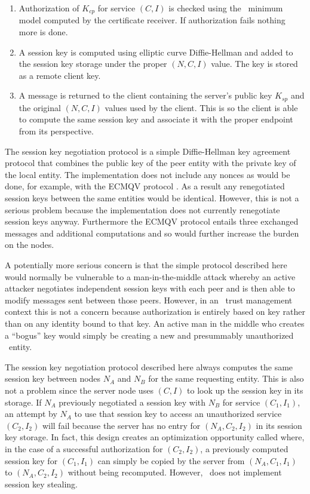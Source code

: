 \begin{enumerate}
\item Authorization of $K_{cp}$ for service $(C, I)$ is checked using the \RT\ minimum model
  computed by the certificate receiver. If authorization fails nothing more is done.
\item A session key is computed using elliptic curve Diffie-Hellman and added to the session key
  storage under the proper $(N, C, I)$ value. The key is stored as a remote client key.
\item A message is returned to the client containing the server's public key $K_{sp}$ and the
  original $(N, C, I)$ values used by the client. This is so the client is able to compute the
  same session key and associate it with the proper endpoint from its perspective.
\end{enumerate}

The session key negotiation protocol is a simple Diffie-Hellman key agreement protocol that
combines the public key of the peer entity with the private key of the local entity. The
implementation does not include any nonces as would be done, for example, with the ECMQV
protocol \cite{ISO-IEC-1170-3:2008}. As a result any renegotiated session keys between the same
entities would be identical. However, this is not a serious problem because the implementation
does not currently renegotiate session keys anyway. Furthermore the ECMQV protocol entails three
exchanged messages and additional computations and so would further increase the burden on the
nodes.

A potentially more serious concern is that the simple protocol described here would normally be
vulnerable to a man-in-the-middle attack whereby an active attacker negotiates independent
session keys with each peer and is then able to modify messages sent between those peers.
However, in an \RT\ trust management context this is not a concern because authorization is
entirely based on key rather than on any identity bound to that key. An active man in the middle
who creates a ``bogus'' key would simply be creating a new and presummably unauthorized \RT\
entity.

The session key negotiation protocol described here always computes the same session key between
nodes $N_A$ and $N_B$ for the same requesting entity. This is also not a problem since the
server node uses $(C, I)$ to look up the session key in its storage. If $N_A$ previously
negotiated a session key with $N_B$ for service $(C_1, I_1)$, an attempt by $N_A$ to use that
session key to access an unauthorized service $(C_2, I_2)$ will fail because the server has no
entry for $(N_A, C_2, I_2)$ in its session key storage. In fact, this design creates an
optimization opportunity called \newterm{session key stealing} where, in the case of a
successful authorization for $(C_2, I_2)$, a previously computed session key for $(C_1, I_1)$
can simply be copied by the server from $(N_A, C_1, I_1)$ to $(N_A, C_2, I_2)$ without being
recomputed. However, \Sprocket\ does not implement session key stealing.


